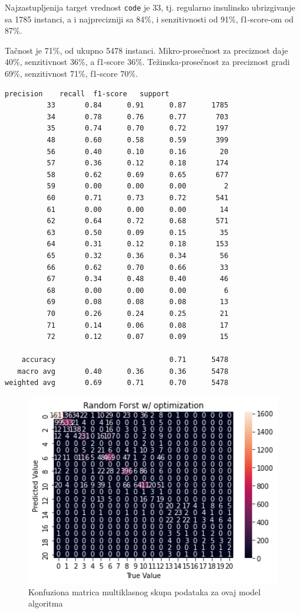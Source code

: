\documentclass[fontsize=12bp, paper=a4]{scrarticle}
\renewcommand\lstlistingname{Implementacija}
\renewcommand\lstlistlistingname{Implementacija}
\begin{document}
Najzastupljenija target vrednost \verb|code| je 33, tj. regularno insulinsko ubrizgivanje sa 1785 instanci, a i najprecizniji sa 84\%, i senzitivnosti od 91\%, f1-score-om od 87\%.

Tačnost je 71\%, od ukupno 5478 instanci. Mikro-prosečnost za preciznost daje 40\%, senzitivnost 36\%, a f1-score 36\%. Težinska-prosečnost za preciznost gradi 69\%, senzitivnost 71\%, f1-score 70\%.
\renewcommand\lstlistingname{Izlaz}
\renewcommand\lstlistlistingname{Izlaz}
\setcounter{lstlisting}{0}
\begin{lstlisting}[caption={\centering Izveštaj o klasifikaciji o ovom modelu}]
              precision    recall  f1-score   support
          33       0.84      0.91      0.87      1785
          34       0.78      0.76      0.77       703
          35       0.74      0.70      0.72       197
          48       0.60      0.58      0.59       399
          56       0.40      0.10      0.16        20
          57       0.36      0.12      0.18       174
          58       0.62      0.69      0.65       677
          59       0.00      0.00      0.00         2
          60       0.71      0.73      0.72       541
          61       0.00      0.00      0.00        14
          62       0.64      0.72      0.68       571
          63       0.50      0.09      0.15        35
          64       0.31      0.12      0.18       153
          65       0.32      0.36      0.34        56
          66       0.62      0.70      0.66        33
          67       0.34      0.48      0.40        46
          68       0.00      0.00      0.00         6
          69       0.08      0.08      0.08        13
          70       0.26      0.24      0.25        21
          71       0.14      0.06      0.08        17
          72       0.12      0.07      0.09        15

    accuracy                           0.71      5478
   macro avg       0.40      0.36      0.36      5478
weighted avg       0.69      0.71      0.70      5478
\end{lstlisting}
\begin{figure}[h]
    \centering
    \includegraphics[width=1\textwidth]{4.png}
    \caption{\centering Konfuziona matrica multiklasnog skupa podataka za ovaj model algoritma}
\end{figure}
\newpage
\end{document}
